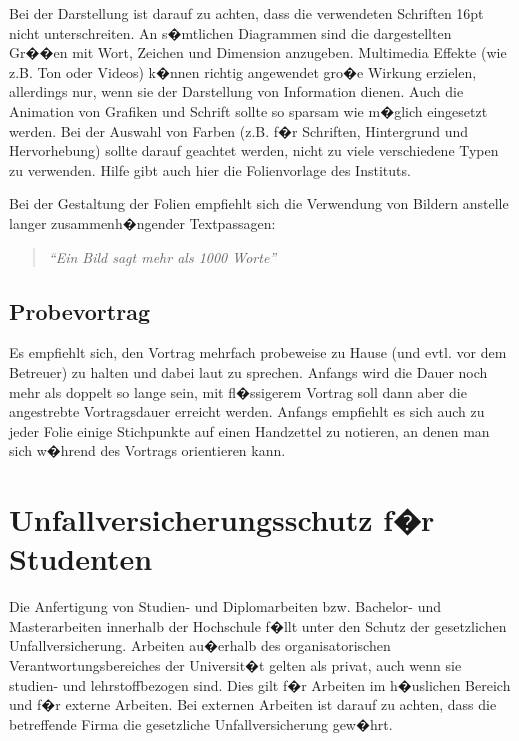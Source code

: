 Bei der Darstellung ist darauf zu achten, dass die verwendeten Schriften 16pt nicht unterschreiten.
An s�mtlichen Diagrammen sind die dargestellten Gr��en mit Wort, Zeichen und Dimension anzugeben.
Multimedia Effekte (wie z.B. Ton oder Videos) k�nnen richtig angewendet gro�e Wirkung erzielen,
allerdings nur, wenn sie der Darstellung von Information dienen. Auch die Animation von Grafiken
und Schrift sollte so sparsam wie m�glich eingesetzt werden. Bei der Auswahl von Farben (z.B. f�r
Schriften, Hintergrund und Hervorhebung) sollte darauf geachtet werden, nicht zu viele verschiedene
Typen zu verwenden. Hilfe gibt auch hier die Folienvorlage des Instituts.

Bei der Gestaltung der Folien empfiehlt sich die Verwendung von Bildern anstelle langer
zusammenh�ngender Textpassagen:
\begin{quote}\rmfamily\small\itshape
"`Ein Bild sagt mehr als 1000 Worte"'
\end{quote}

\section{Probevortrag}
Es empfiehlt sich, den Vortrag mehrfach probeweise zu Hause (und evtl. vor dem Betreuer) zu halten
und dabei laut zu sprechen. Anfangs wird die Dauer noch mehr als doppelt so lange sein, mit
fl�ssigerem Vortrag soll dann aber die angestrebte Vortragsdauer erreicht werden. Anfangs empfiehlt
es sich auch zu jeder Folie einige Stichpunkte auf einen Handzettel zu notieren, an denen man sich
w�hrend des Vortrags orientieren kann.

\chapter{Unfallversicherungsschutz f�r Studenten}
Die Anfertigung von Studien- und Diplomarbeiten bzw. Bachelor- und Masterarbeiten innerhalb der Hochschule f�llt unter den Schutz der
gesetzlichen Unfallversicherung. Arbeiten au�erhalb des organisatorischen Verantwortungsbereiches
der Universit�t gelten als privat, auch wenn sie studien- und lehrstoffbezogen sind. Dies gilt f�r
Arbeiten im h�uslichen Bereich und f�r externe Arbeiten. Bei externen Arbeiten
ist darauf zu achten, dass die betreffende Firma die gesetzliche Unfallversicherung gew�hrt.

